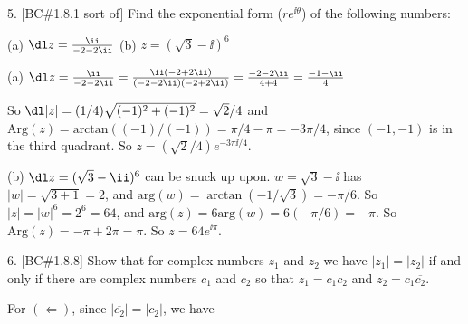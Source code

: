



\loadmsbm

\dl{\displaystyle}
\ctln{\centerline}
\ssk{\smallskip}
\msk{\medskip}
\bsk{\bigskip}

\overfullrule=0pt
\nopagenumbers



\bsk

\bsk

\item{5.} [BC\#1.8.1 sort of] Find the exponential form ($re^{\ii\theta}$) of the following
numbers:

\msk

\item{} (a) $\dl z={{\ii}\over{-2-2\ii}}$ \hskip1in (b) $z=(\sqrt{3}-\ii)^6$


\msk

\item{(a)} $\dl z={{\ii}\over{-2-2\ii}} = 
{{\ii(-2+2\ii)}\over{(-2-2\ii)(-2+2\ii)}} = 
{{-2-2\ii}\over{4+4}} = {{-1-\ii}\over{4}}$

\ssk

\item{} So $\dl |z|=(1/4)\sqrt{(-1)^2+(-1)^2}=\sqrt{2}/4$ and $\text{Arg}(z)=\text{arctan}((-1)/(-1))=\pi/4-\pi=-3\pi/4$,
since $(-1,-1)$ is in the third quadrant. So $z=(\sqrt{2}/4)e^{-3\pi\ii/4}$.

\msk

\item{(b)} $\dl z=(\sqrt{3}-\ii)^6$ can be snuck up upon. $w=\sqrt{3}-\ii$ has $|w|=\sqrt{3+1}=2$, and
$\text{arg}(w)=\arctan(-1/\sqrt{3})=-\pi/6$. 
So $|z|=|w|^6=2^6=64$, and $\text{arg}(z)=6\text{arg}(w)=6(-\pi/6)=-\pi$. So $\text{Arg}(z)=-\pi+2\pi=\pi$.
So $z=64e^{\ii\pi}$.

\bsk

\item{6.} [BC\#1.8.8] Show that for complex numbers $z_1$ and $z_2$ we have $|z_1|=|z_2|$
if and only if there are complex numbers $c_1$ and $c_2$ so that $z_1=c_1c_2$ and $z_2=c_1\overline{c_2}$.

\msk

\item{} For $(\Leftarrow)$, since $|\overline{c_2}|=|c_2|$, we have

